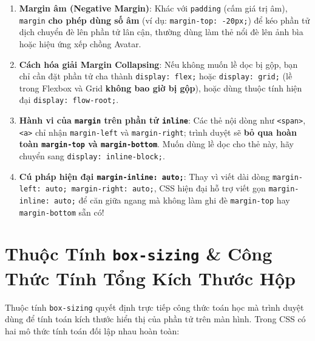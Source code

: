 \documentclass[11pt,oneside]{book}
\newcommand{\codeinline}[1]{\textcolor{accentOrange}{\texttt{#1}}}
\newcommand{\term}[1]{\textbf{\textcolor{primaryBlue}{#1}}}
\DeclareRobustCommand{\csshint}[1]{\texorpdfstring{\textcolor{accentOrange}{\textbf{\texttt{#1}}}}{#1}}
\begin{document}
\begin{conceptBox}
\begin{enumerate}[leftmargin=1.5em, itemsep=3.5pt, parsep=0pt]
    \item \textbf{Margin âm (\term{Negative Margin})}: Khác với \codeinline{padding} (cấm giá trị âm), \codeinline{margin} \textbf{cho phép dùng số âm} (ví dụ: \codeinline{margin-top: -20px;}) để kéo phần tử dịch chuyển đè lên phần tử lân cận, thường dùng làm thẻ nổi đè lên ảnh bìa hoặc hiệu ứng xếp chồng Avatar.
    \item \textbf{Cách hóa giải \term{Margin Collapsing}}: Nếu không muốn lề dọc bị gộp, bạn chỉ cần đặt phần tử cha thành \codeinline{display: flex;} hoặc \codeinline{display: grid;} (lề trong Flexbox và Grid \textbf{không bao giờ bị gộp}), hoặc dùng thuộc tính hiện đại \codeinline{display: flow-root;}.
    \item \textbf{Hành vi của \codeinline{margin} trên phần tử \codeinline{inline}}: Các thẻ nội dòng như \codeinline{<span>}, \codeinline{<a>} chỉ nhận \codeinline{margin-left} và \codeinline{margin-right}; trình duyệt sẽ \textbf{bỏ qua hoàn toàn \codeinline{margin-top} và \codeinline{margin-bottom}}. Muốn dùng lề dọc cho thẻ này, hãy chuyển sang \codeinline{display: inline-block;}.
    \item \textbf{Cú pháp hiện đại \codeinline{margin-inline: auto;}}: Thay vì viết dài dòng \codeinline{margin-left: auto; margin-right: auto;}, CSS hiện đại hỗ trợ viết gọn \codeinline{margin-inline: auto;} để căn giữa ngang mà không làm ghi đè \codeinline{margin-top} hay \codeinline{margin-bottom} sẵn có!
\end{enumerate}
\end{conceptBox}

\clearpage

\section{Thuộc Tính \csshint{box-sizing} \& Công Thức Tính Tổng Kích Thước Hộp}
\label{sec:box_sizing_deep_dive}

Thuộc tính \codeinline{box-sizing} quyết định trực tiếp công thức toán học mà trình duyệt dùng để tính toán kích thước hiển thị của phần tử trên màn hình. Trong CSS có hai mô thức tính toán đối lập nhau hoàn toàn:
\end{document}
